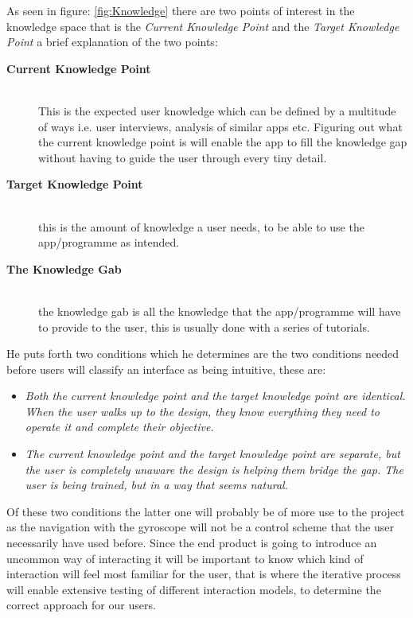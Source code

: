 As seen in figure: \ref{fig:Knowledge} there are two points of interest in the 
knowledge space that is the \textit{Current Knowledge Point} and the 
\textit{Target Knowledge Point} a brief explanation of the two points:
\begin{description}
 \item[\textbf{Current Knowledge Point}] \hfill\\
This is the expected user knowledge which can be defined by a multitude of ways 
i.e. user interviews, analysis of similar apps etc. Figuring out what the 
current knowledge point is will enable the app to fill the knowledge gap without 
having to guide the user through every tiny detail. 
\item[\textbf{Target Knowledge Point}]\hfill\\
this is the amount of knowledge a user needs, to be able to use the app/programme 
as intended.
\item[\textbf{The Knowledge Gab}]\hfill\\
the knowledge gab is all the knowledge that the app/programme will have to 
provide to the user, this is usually done with a series of tutorials. 
\end{description}

He puts forth two conditions which he determines are the two conditions needed 
before users will classify an interface as being intuitive, these are:
\begin{itemize}
\item \textit{Both the current knowledge point and the target knowledge point are 
identical. When the user walks up to the design, they know everything they need 
to operate it and complete their objective.}
\item \textit{The current knowledge point and the target knowledge point are 
separate, but the user is completely unaware the design is helping them bridge 
the gap. The user is being trained, but in a way that seems natural.}
\end{itemize}\label{intuitiveConditions} 
Of these two conditions the latter one will probably be of more use to the 
project as the navigation with the gyroscope will not be a control scheme that 
the user necessarily  have used before. Since the end product is going to 
introduce an uncommon way of interacting it will be important to know which kind 
of interaction will feel most familiar for the user, that is where the iterative 
process will enable extensive testing of different interaction models, to 
determine the correct approach for our users.

